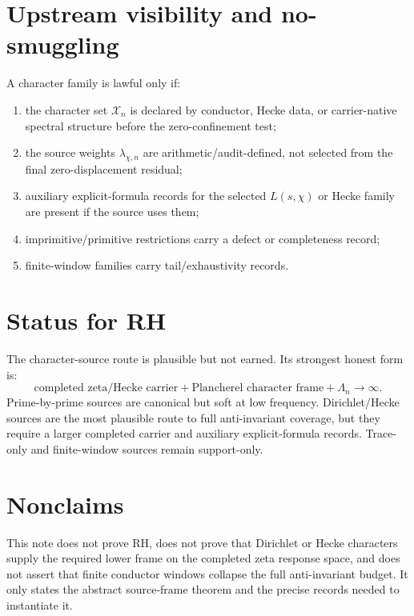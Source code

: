 \documentclass[11pt]{article}
\newcommand{\Xn}{\mathcal X_n}
\begin{document}
\section{Upstream visibility and no-smuggling}
A character family is lawful only if:
\begin{enumerate}[label=\textbf{G\arabic*.}]
  \item the character set \(\Xn\) is declared by conductor, Hecke data, or carrier-native spectral structure before the zero-confinement test;
  \item the source weights \(\lambda_{\chi,n}\) are arithmetic/audit-defined, not selected from the final zero-displacement residual;
  \item auxiliary explicit-formula records for the selected \(L(s,\chi)\) or Hecke family are present if the source uses them;
  \item imprimitive/primitive restrictions carry a defect or completeness record;
  \item finite-window families carry tail/exhaustivity records.
\end{enumerate}

\section{Status for RH}
The character-source route is plausible but not earned. Its strongest honest form is:
\begin{equation}
  \boxed{\text{completed zeta/Hecke carrier} + \text{Plancherel character frame} + \Lambda_n\to\infty.}
\end{equation}
Prime-by-prime sources are canonical but soft at low frequency. Dirichlet/Hecke sources are the most plausible route to full anti-invariant coverage, but they require a larger completed carrier and auxiliary explicit-formula records. Trace-only and finite-window sources remain support-only.

\section{Nonclaims}
This note does not prove RH, does not prove that Dirichlet or Hecke characters supply the required lower frame on the completed zeta response space, and does not assert that finite conductor windows collapse the full anti-invariant budget. It only states the abstract source-frame theorem and the precise records needed to instantiate it.
\end{document}
